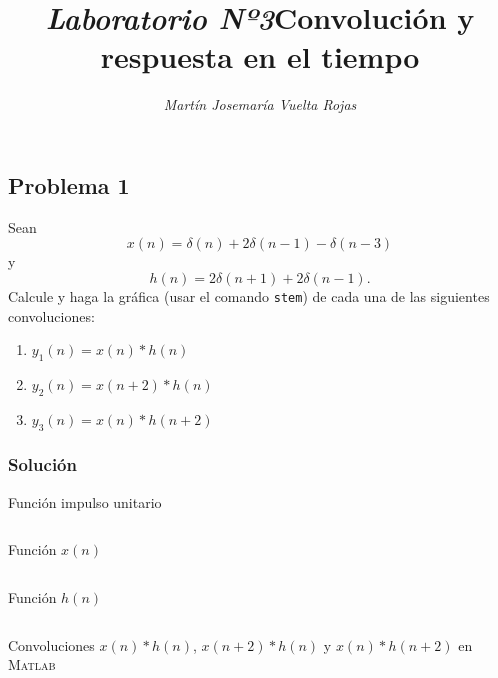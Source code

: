 \documentclass[a4paper,12pt,final]{article}
\begin{document}
  \title{\textit{\Large Laboratorio Nº3}\linebreak{}\linebreak{}\textbf{\Huge Convolución y respuesta en el tiempo}}
  \author{\emph{Martín Josemaría Vuelta Rojas}}
  \maketitle

  \subsection*{Problema 1}
    \noindent Sean
    $$x\left(n\right) = \delta\left(n\right) + 2\delta\left(n-1\right) - \delta\left(n-3\right)$$
    \noindent y
    $$h\left(n\right) = 2\delta\left(n+1\right) + 2\delta\left(n-1\right).$$
    Calcule y haga la gráfica (usar el comando \texttt{stem}) de cada una de las siguientes
    convoluciones:

    \begin{enumerate}[label=\alph*)]
      \item $y_1\left(n\right) = x\left(n\right)*h\left(n\right)$
      \item $y_2\left(n\right) = x\left(n+2\right)*h\left(n\right)$
      \item $y_3\left(n\right) = x\left(n\right)*h\left(n+2\right)$
    \end{enumerate}

    \subsubsection*{Solución}
      \begin{listing}[H]
        \caption{Función impulso unitario}
        \label{script01A}
        \inputminted{matlab}{./laboratorio_3/impulso.m}
      \end{listing}

      \begin{listing}[H]
        \caption{Función $x\left(n\right)$}
        \label{script01B}
        \inputminted{matlab}{./laboratorio_3/p1_X.m}
      \end{listing}

      \begin{listing}[H]
        \caption{Función $h\left(n\right)$}
        \label{script01C}
        \inputminted{matlab}{./laboratorio_3/p1_H.m}
      \end{listing}

      \begin{listing}[H]
        \caption{Convoluciones $x\left(n\right)*h\left(n\right)$, $x\left(n+2\right)*h\left(n\right)$ y $x\left(n\right)*h\left(n+2\right)$ en \textsc{Matlab} }
        \label{script01D}
        \inputminted{matlab}{./laboratorio_3/problema01.m}
      \end{listing}
\end{document}
